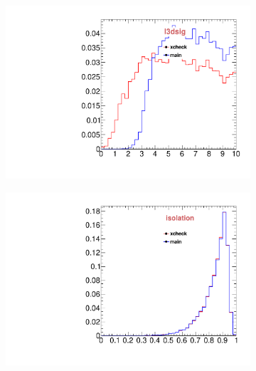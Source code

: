 \begin{figure}
\begin{subfigure}[b]{0.2\textwidth}
                \includegraphics[width=\textwidth]{Figures/VariablesComparison/MC_endcaps_figs/fls3d}
                \label{fig:MC_endcaps_fls3d}
        \end{subfigure}
        \begin{subfigure}[b]{0.2\textwidth}
                \centering
                \includegraphics[width=\textwidth]{Figures/VariablesComparison/MC_endcaps_figs/iso}
                \label{fig:MC_endcaps_iso}
        \end{subfigure}
        \begin{subfigure}[b]{0.2\textwidth}
                \centering

\end{subfigure}
\end{figure}
